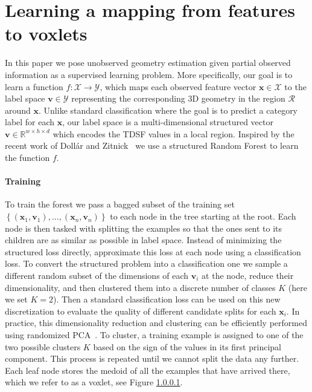 \documentclass[10pt,twocolumn,letterpaper]{article}
\begin{document}
\section{Learning a mapping from features to voxlets}
\label{sec:forest_train}
In this paper we pose unobserved geometry estimation given partial observed information as a supervised learning problem. 
More specifically, our goal is to learn a function $f: \mathcal{X}\to \mathcal{Y}$, which maps each observed feature vector $\mathbf{x} \in \mathcal{X}$ to the label space $\mathbf{v} \in \mathcal{Y}$ representing the corresponding 3D geometry in the region $\mathcal{R}$ around $\mathbf{x}$. 
Unlike standard classification where the goal is to predict a category label for each $\mathbf{x}$, our label space is a multi-dimensional structured vector $\mathbf{v} \in \mathbb{R}^{w\times{}h\times{}d}$ which encodes the TDSF values in a local region. 
Inspired by the recent work of Doll{\'a}r and Zitnick~\cite{dollar-iccv-2013} we use a structured Random Forest to learn the function $f$. 

\paragraph{Training} 
To train the forest we pass a bagged subset of the training set $\left\{(\mathbf{x}_1, \mathbf{v}_1), ..., (\mathbf{x}_n, \mathbf{v}_n)\right\}$ to each node in the tree starting at the root. 
Each node is then tasked with splitting the examples so that the ones sent to its children are as similar as possible in label space. 
Instead of minimizing the structured loss directly, \cite{dollar-iccv-2013} approximate this loss at each node using a classification loss.
To convert the structured problem into a classification one we sample a different random subset of the dimensions of each $\mathbf{v}_i$ at the node, reduce their dimensionality, and then clustered them into a discrete number of classes $K$ (here we set $K=2$).
Then a standard classification loss can be used on this new discretization to evaluate the quality of different candidate splits for each $\mathbf{x}_i$. 
In practice, this dimensionality reduction and clustering can be efficiently performed using randomized PCA~\cite{halko-siam-2011}.
To cluster, a training example is assigned to one of the two possible clusters $K$ based on the sign of the values in its first principal component. 
This process is repeated until we cannot split the data any further. 
Each leaf node stores the medoid of all the examples that have arrived there, which we refer to as a voxlet, see Figure \ref{}. 
\end{document}
